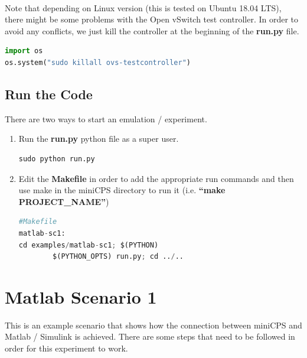 \documentclass[book,a4paper,12pt,oneside]{memoir}
\begin{document}
\noindent \\ Note that depending on Linux version (this is tested on Ubuntu 18.04 LTS), there might be some problems with the Open vSwitch test controller.  In order to avoid any conflicts, we just kill the controller at the beginning of the \textbf{run.py} file.

\begin{lstlisting}[backgroundcolor = \color{ultralightgray}, language = Python, xleftmargin = 0.1cm, framexleftmargin = 0.3em, showstringspaces=false]
import os
os.system("sudo killall ovs-testcontroller")
\end{lstlisting}


\newpage
\section{Run the Code}
\label{cha:basicuse-sec:runthecode}
There are two ways to start an emulation / experiment.

\begin{enumerate}
\item Run the \textbf{run.py} python file as a super user.

\begin{lstlisting}[backgroundcolor = \color{ultralightgray}, language = Python, xleftmargin = 0.1cm, framexleftmargin = 0.3em, showstringspaces=false]
sudo python run.py
\end{lstlisting}


\item Edit the \textbf{Makefile} in order to add the appropriate run commands and then use make in the miniCPS directory to run it (i.e. \textbf{``make PROJECT\_NAME''})

\begin{lstlisting}[backgroundcolor = \color{ultralightgray}, language = Python, xleftmargin = 0.1cm, framexleftmargin = 0.3em, showstringspaces=false]
#Makefile
matlab-sc1:
cd examples/matlab-sc1; $(PYTHON) 
        $(PYTHON_OPTS) run.py; cd ../..
\end{lstlisting}
\end{enumerate}

\chapter{Matlab Scenario 1}
\label{cha:matlabsc1}

This is an example scenario that shows how the connection between miniCPS and Matlab / Simulink is achieved.  There are some steps that need to be followed in order for this experiment to work.
\end{document}
